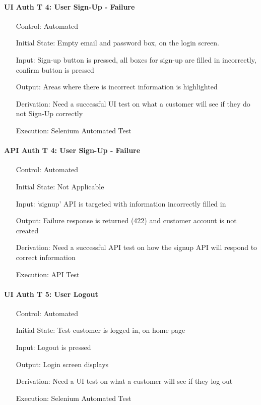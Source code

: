 \documentclass[12pt, titlepage]{article}
\begin{document}
\paragraph*{UI Auth T 4: User Sign-Up - Failure}
\begin{itemize}
	\item[Control:] Automated
	\item[Initial State:] Empty email and password box, on the login screen.
	\item[Input:] Sign-up button is pressed, all boxes for sign-up are filled in incorrectly, confirm button is pressed
	\item[Output:] Areas where there is incorrect information is highlighted
	\item[Derivation:] Need a successful UI test on what a customer will see if they do not Sign-Up correctly
	\item[Execution:] Selenium Automated Test
\end{itemize}

\paragraph*{API Auth T 4: User Sign-Up - Failure}
\begin{itemize}
	\item[Control:] Automated
	\item[Initial State:] Not Applicable
	\item[Input:] `signup' API is targeted with information incorrectly filled in
	\item[Output:] Failure response is returned (422) and customer account is not created
	\item[Derivation:] Need a successful API test on how the signup API will respond to correct information
	\item[Execution:] API Test
\end{itemize}

\paragraph*{UI Auth T 5: User Logout}
\begin{itemize}
	\item[Control:] Automated
	\item[Initial State:] Test customer is logged in, on home page
	\item[Input:] Logout is pressed
	\item[Output:] Login screen displays
	\item[Derivation:] Need a UI test on what a customer will see if they log out
	\item[Execution:] Selenium Automated Test
\end{itemize}
\end{document}
